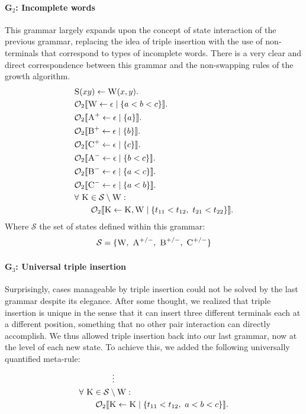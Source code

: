 \documentclass[nonatbib,numbers,10pt]{sigplanconf}
\newcommand\s{\textsc}
\newcommand{\Orderr}[5]{
	\mathcal{#1}_{#5}\llbracket #2 \leftarrow #3 \mid \{ #4 \} \rrbracket.
}
\newcommand{\Or}[4]{\Orderr{O}{#1}{#2}{#3}{#4}}
\begin{document}
\paragraph{G$_2$: Incomplete words}
This grammar largely expands upon the concept of state interaction of the previous grammar, replacing the idea of triple insertion with the use of non-terminals that correspond to types of incomplete words. There is a very clear and direct correspondence between this grammar and the non-swapping rules of the growth algorithm.
\begin{align*}
&\s{S}(xy) \leftarrow \s{W}(x,y). \\
&\Or{\s{W}}{\epsilon}{a < b < c}{2} \\
&\Or{\s{A}^+}{\epsilon}{a}{2} \\
&\Or{\s{B}^+}{\epsilon}{b}{2} \\
&\Or{\s{C}^+}{\epsilon}{c}{2} \\
&\Or{\s{A}^-}{\epsilon}{b < c}{2} \\
&\Or{\s{B}^-}{\epsilon}{a < c}{2} \\
&\Or{\s{C}^-}{\epsilon}{a < b}{2} \\
&\forall \ \s{K} \in \mathcal{S} \setminus \s{W}:\\ 
&\quad\quad\Or{\s{K}}{\s{K}, \s{W}}{t_{11} < t_{12},\ t_{21} < t_{22}}{2}
\end{align*}
Where $\mathcal{S}$ the set of states defined within this grammar:
\[
\mathcal{S}= \{\textsc{W},\ \textsc{A}^{+/-},\ \textsc{B}^{+/-},\ \textsc{C}^{+/-}\}
\]
\paragraph{G$_3$: Universal triple insertion}
Surprisingly, cases manageable by triple insertion could not be solved by the last grammar despite its elegance. After some thought, we realized that triple insertion is unique in the sense that it can insert three different terminals each at a different position, something that no other pair interaction can directly accomplish. We thus allowed triple insertion back into our last grammar, now at the level of each new state. To achieve this, we added the following universally quantified meta-rule:
\begin{align*}
& \quad\quad\quad\quad \vdots \\
&\forall \ \s{K} \in \mathcal{S} \setminus \s{W}:\\ 
&\quad\quad\Or{\s{K}}{\s{K}}{t_{11} < t_{12},\ a < b < c}{2}
\end{align*}
\end{document}
